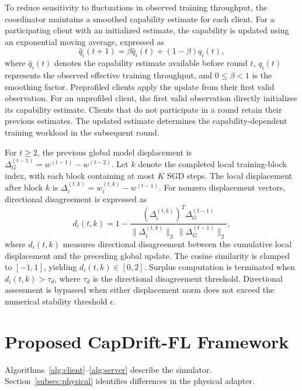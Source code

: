 \documentclass[conference]{IEEEtran}
\begin{document}
To reduce sensitivity to fluctuations in observed training throughput, the coordinator maintains a smoothed capability estimate for each client. For a participating client with an initialized estimate, the capability is updated using an exponential moving average, expressed as
\begin{equation}
\widehat q_i(t+1) =
\beta\widehat q_i(t)+(1-\beta)q_i(t),
\label{eq:smoothing}
\end{equation}
where $\widehat q_i(t)$ denotes the capability estimate available before round $t$, $q_i(t)$ represents the observed effective training throughput, and $0\leq\beta<1$ is the smoothing factor. 
Preprofiled clients apply the update from their first valid observation. For an unprofiled client, the first valid observation directly initializes its capability estimate.
Clients that do not participate in a round retain their previous estimates. The updated estimate determines the capability-dependent training workload in the subsequent round.

For $t\ge2$, the previous global model
displacement is $\Delta_G^{(t-1)}=w^{(t-1)}-w^{(t-2)}$.
Let $k$ denote the completed local
training-block index, with each block
containing at most $K$ SGD steps.
The local displacement after block $k$ is $\Delta_i^{(t,k)}=w_i^{(t,k)}-w^{(t-1)}$.
For nonzero displacement vectors,
directional disagreement is expressed as
\begin{equation}
d_i(t,k) = 1 -
\frac{\left(\Delta_i^{(t,k)}\right)^T
\Delta_G^{(t-1)}}
{\|\Delta_i^{(t,k)}\|_2\,
\|\Delta_G^{(t-1)}\|_2},
\label{eq:drift}
\end{equation}
where $d_i(t,k)$ measures directional
disagreement between the cumulative local displacement and the preceding global update. The cosine similarity is clamped to $[-1,1]$, yielding $d_i(t,k)\in[0,2]$.
Surplus computation is terminated when
$d_i(t,k)>\tau_d$, where $\tau_d$ is the
directional disagreement threshold.
Directional assessment is bypassed when
either displacement norm does not exceed
the numerical stability threshold $\epsilon$.

\section{Proposed CapDrift-FL Framework}
\label{sec:framework}
Algorithms~\ref{alg:client}--\ref{alg:server} describe the simulator. Section~\ref{subsec:physical} identifies differences in the physical adapter.
\end{document}
